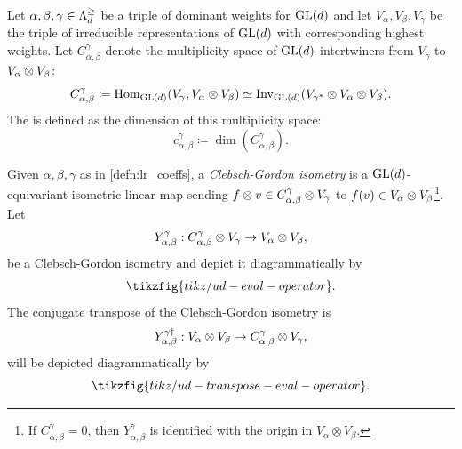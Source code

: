 \documentclass[notitlepage, 10pt]{article}
\begin{document}
\begin{defn}
    \label{defn:lr_coeffs}
    Let $\alpha, \beta, \gamma \in \Lambda^{\geq}_{d}$ be a triple of dominant weights for $\operatorname{GL}(d)$ and let $V_{\alpha},V_{\beta},V_{\gamma}$ be the triple of irreducible representations of $\operatorname{GL}(d)$ with corresponding highest weights.
    Let $C_{\alpha, \beta}^{\gamma}$ denote the multiplicity space of $\operatorname{GL}(d)$-intertwiners from $V_{\gamma}$ to $V_{\alpha} \otimes V_{\beta}$:
    \begin{equation}
        C_{\alpha, \beta}^{\gamma} \coloneqq \operatorname{Hom}_{\operatorname{GL}(d)}(V_{\gamma}, V_{\alpha}\otimes V_{\beta}) \simeq \operatorname{Inv}_{\operatorname{GL}(d)}(V_{\gamma^*} \otimes V_{\alpha} \otimes V_{\beta}).
    \end{equation}
    The  is defined as the dimension of this multiplicity space:
    \begin{equation}
        c_{\alpha,\beta}^{\gamma} \coloneqq \dim(C_{\alpha, \beta}^{\gamma}).
    \end{equation}
\end{defn}
\begin{defn}
    Given $\alpha,\beta,\gamma$ as in \cref{defn:lr_coeffs}, a \textit{Clebsch-Gordon isometry} is a $\operatorname{GL}(d)$-equivariant isometric linear map sending $f \otimes v \in C_{\alpha,\beta}^{\gamma} \otimes V_{\gamma}$ to $f(v) \in V_{\alpha}\otimes V_{\beta}$\footnote{If $C_{\alpha,\beta}^{\gamma} = 0$, then $Y_{\alpha,\beta}^{\gamma}$ is identified with the origin in $V_{\alpha}\otimes V_{\beta}$.}.
    Let
    \begin{equation}
        Y_{\alpha,\beta}^{\gamma} : C_{\alpha,\beta}^{\gamma} \otimes V_{\gamma} \to V_{\alpha} \otimes V_{\beta},
    \end{equation}
    be a Clebsch-Gordon isometry and depict it diagrammatically by
    \begin{equation}
        \tikzfig{tikz/ud-eval-operator}.
    \end{equation}
    The conjugate transpose of the Clebsch-Gordon isometry is 
    \begin{equation}
        Y_{\alpha,\beta}^{\gamma \dagger} : V_{\alpha} \otimes V_{\beta} \to C_{\alpha,\beta}^{\gamma} \otimes V_{\gamma},
    \end{equation}
    will be depicted diagrammatically by
    \begin{equation}
        \tikzfig{tikz/ud-transpose-eval-operator}.
    \end{equation}
\end{defn}
\end{document}
